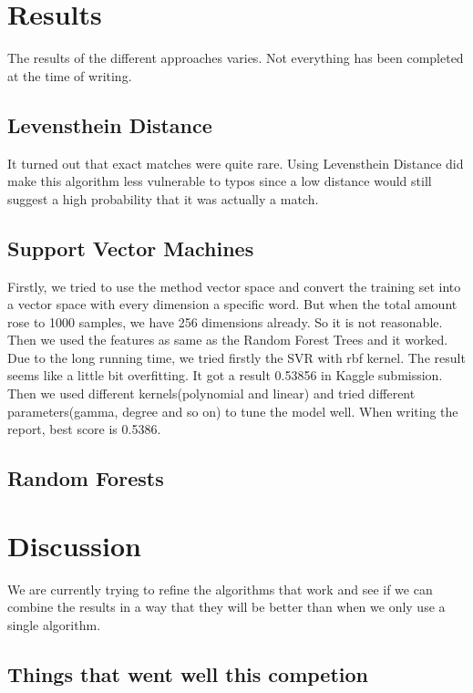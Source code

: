 \documentclass{article}
\begin{document}
\section{Results}

The results of the different approaches varies. Not everything has been completed at the time of writing.

\subsection{Levensthein Distance}
It turned out that exact matches were quite rare. Using Levensthein Distance did make this algorithm less vulnerable to typos since a low distance would still suggest a high probability that it was actually a match.

\subsection{Support Vector Machines}
Firstly, we tried to use the method vector space and convert the training set into a vector space with every dimension a specific word. But when the total amount rose to 1000 samples, we have 256 dimensions already. So it is not reasonable. Then we used the features as same as the Random Forest Trees and it worked. Due to the long running time, we tried firstly the SVR with rbf kernel. The result seems like a little bit overfitting. It got a result 0.53856 in Kaggle submission. Then we used different kernels(polynomial and linear) and tried different parameters(gamma, degree and so on) to tune the model well. When writing the report, best score is 0.5386.

\subsection{Random Forests}

\section{Discussion}

We are currently trying to refine the algorithms that work and see if we can combine the results in a way that they will be better than when we only use a single algorithm.\\

\subsection{Things that went well this competion}
\end{document}
